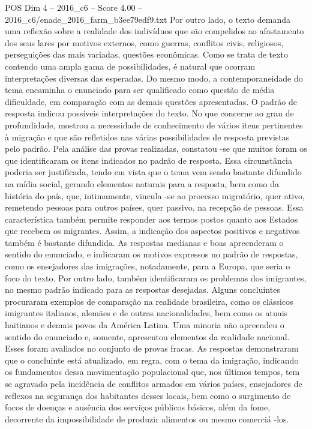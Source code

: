 \begin{textsample}{POS Dim 4 – 2016\_c6 – Score 4.00 – 2016\_c6/enade\_2016\_farm\_b3ee79edf9.txt}
Por outro lado, o texto demanda uma reflexão sobre a realidade dos indivíduos que são compelidos ao afastamento dos seus lares por motivos externos, como guerras, conflitos civis, religiosos, perseguições das mais variadas, questões econômicas.
Como se trata de texto contendo uma ampla gama de possibilidades, é natural que ocorram interpretações diversas das esperadas.
Do mesmo modo, a contemporaneidade do tema encaminha o enunciado para ser qualificado como questão de média dificuldade, em comparação com as demais questões apresentadas.
O padrão de resposta indicou possíveis interpretações do texto.
No que concerne ao grau de profundidade, mostrou a necessidade de conhecimento de vários itens pertinentes à migração e que são refletidos nas várias possibilidades de resposta previstas pelo padrão.
Pela análise das provas realizadas, constatou -se que muitos foram os que identificaram os itens indicados no padrão de resposta.
Essa circunstância poderia ser justificada, tendo em vista que o tema vem sendo bastante difundido na mídia social, gerando elementos naturais para a resposta, bem como da história do país, que, intimamente, vincula -se ao processo migratório, quer ativo, remetendo pessoas para outros países, quer passivo, na recepção de pessoas.
Essa característica também permite responder aos termos postos quanto aos Estados que recebem os migrantes.
Assim, a indicação dos aspectos positivos e negativos também é bastante difundida.
As respostas medianas e boas apreenderam o sentido do enunciado, e indicaram os motivos expressos no padrão de respostas, como os ensejadores das imigrações, notadamente, para a Europa, que seria o foco do texto.
Por outro lado, também identificaram os problemas dos imigrantes, no mesmo padrão indicado para as respostas desejadas.
Alguns concluintes procuraram exemplos de comparação na realidade brasileira, como os clássicos imigrantes italianos, alemães e de outras nacionalidades, bem como os atuais haitianos e demais povos da América Latina.
Uma minoria não apreendeu o sentido do enunciado e, somente, apresentou elementos da realidade nacional.
Esses foram avaliados no conjunto de provas fracas.
As respostas demonstraram que o concluinte está atualizado, em regra, com o tema da imigração, indicando os fundamentos dessa movimentação populacional que, nos últimos tempos, tem se agravado pela incidência de conflitos armados em vários países, ensejadores de reflexos na segurança dos habitantes desses locais, bem como o surgimento de focos de doenças e ausência dos serviços públicos básicos, além da fome, decorrente da impossibilidade de produzir alimentos ou mesmo comerciá -los.

\end{textsample}
